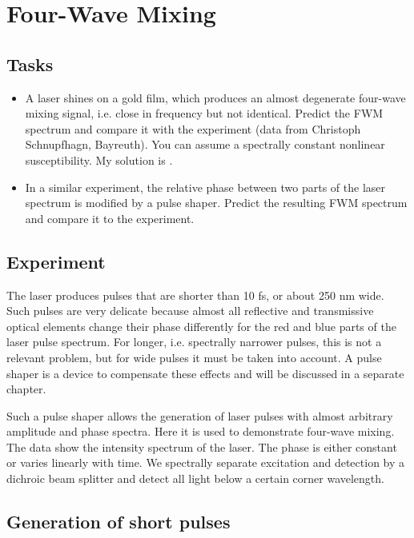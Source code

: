 \renewcommand{\lastmod}{June 20, 2024}
\renewcommand{\chapterauthors}{Markus Lippitz}


\chapter{Four-Wave Mixing}


\section{Tasks}

\begin{itemize}
\item A laser shines on a gold film, which produces an almost degenerate four-wave mixing signal, i.e. close in frequency but not identical. Predict the FWM spectrum and compare it with the experiment (data from Christoph Schnupfhagn, Bayreuth). You can assume a spectrally constant nonlinear susceptibility. My solution is .

\item In a similar experiment, the relative phase between two parts of the laser spectrum is modified by a pulse shaper. Predict the resulting FWM spectrum and compare it to the experiment.
\end{itemize}

\section{Experiment}

The laser produces pulses that are shorter than 10 fs, or about 250 nm wide. Such pulses are very delicate because almost all reflective and transmissive optical elements change their phase differently for the red and blue parts of the laser pulse spectrum. For longer, i.e. spectrally narrower pulses, this is not a relevant problem, but for wide pulses it must be taken into account. A pulse shaper is a device to compensate these effects and will be discussed in a separate chapter.

Such a pulse shaper allows the generation of laser pulses with almost arbitrary amplitude and phase spectra. Here it is used to demonstrate four-wave mixing. The data show the intensity spectrum of the laser. The phase is either constant or varies linearly with time.
We spectrally separate excitation and detection by a dichroic beam splitter and detect all light below a certain corner wavelength. 


\section{Generation of short pulses}


